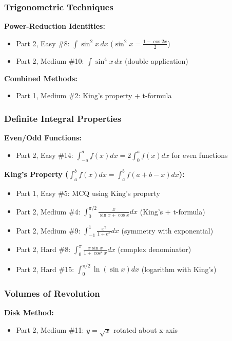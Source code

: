 \subsubsection*{Trigonometric Techniques}

\textbf{Power-Reduction Identities:}
\begin{itemize}
  \item Part 2, Easy \#8: $\int \sin^2 x \, dx$ ($\sin^2 x = \frac{1-\cos 2x}{2}$)
  \item Part 2, Medium \#10: $\int \sin^4 x \, dx$ (double application)
\end{itemize}

\textbf{Combined Methods:}
\begin{itemize}
  \item Part 1, Medium \#2: King's property + t-formula
\end{itemize}

\subsubsection*{Definite Integral Properties}

\textbf{Even/Odd Functions:}
\begin{itemize}
  \item Part 2, Easy \#14: $\int_{-a}^{a} f(x)dx = 2\int_0^a f(x)dx$ for even functions
\end{itemize}

\textbf{King's Property ($\int_a^b f(x)dx = \int_a^b f(a+b-x)dx$):}
\begin{itemize}
  \item Part 1, Easy \#5: MCQ using King's property
  \item Part 2, Medium \#4: $\int_0^{\pi/2} \frac{x}{\sin x + \cos x}dx$ (King's + t-formula)
  \item Part 2, Medium \#9: $\int_{-1}^{1} \frac{x^2}{1+e^x}dx$ (symmetry with exponential)
  \item Part 2, Hard \#8: $\int_0^{\pi} \frac{x\sin x}{1+\cos^2 x}dx$ (complex denominator)
  \item Part 2, Hard \#15: $\int_0^{\pi/2} \ln(\sin x)dx$ (logarithm with King's)
\end{itemize}

\subsubsection*{Volumes of Revolution}

\textbf{Disk Method:}
\begin{itemize}
  \item Part 2, Medium \#11: $y = \sqrt{x}$ rotated about x-axis
\end{itemize}

